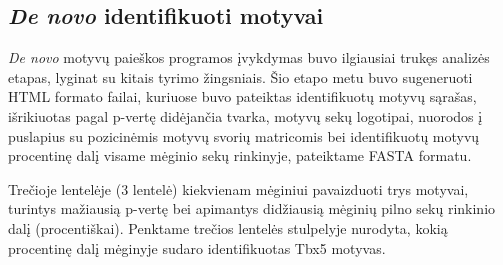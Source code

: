 \documentclass[12pt]{article}
\begin{document}
\newpage

\subsection{\emph{De novo} identifikuoti motyvai}
\emph{De novo} motyvų paieškos programos įvykdymas buvo
ilgiausiai trukęs analizės etapas, lyginat su kitais 
tyrimo žingsniais. Šio etapo metu buvo sugeneruoti HTML
formato failai, kuriuose buvo pateiktas identifikuotų motyvų sąrašas,
išrikiuotas pagal p-vertę didėjančia tvarka, motyvų sekų logotipai,
nuorodos į puslapius su pozicinėmis motyvų svorių matricomis bei
identifikuotų motyvų procentinę dalį visame mėginio sekų rinkinyje,
pateiktame FASTA formatu.

Trečioje lentelėje (3 lentelė) kiekvienam mėginiui pavaizduoti trys
motyvai, turintys mažiausią p-vertę bei apimantys didžiausią mėginių
pilno sekų rinkinio dalį (procentiškai). Penktame trečios lentelės
stulpelyje nurodyta, kokią procentinę dalį mėginyje sudaro
identifikuotas Tbx5 motyvas.
\end{document}
